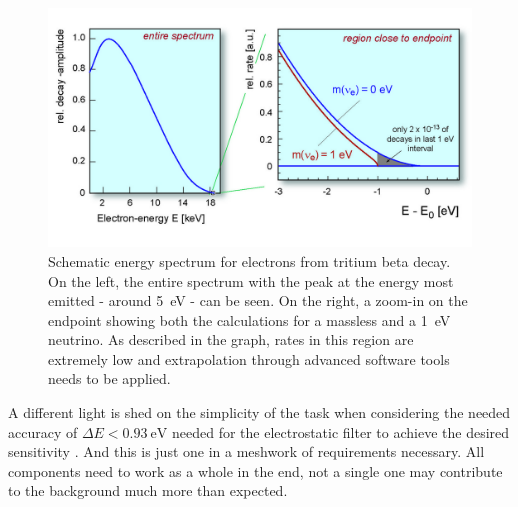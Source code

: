       \begin{figure}
	\centering
      	\includegraphics[width = 0.9 \textwidth]{graphics/katrinExperiment/electronSpectrum.jpg}
      	\caption[Schematic tritium energy spectrum]{Schematic energy spectrum for electrons from tritium beta decay. On the left, the entire spectrum with the peak at the energy most emitted - around \SI{5}{\electronvolt} - can be seen. On the right, a zoom-in on the endpoint showing both the calculations for a massless and a \SI{1}{\electronvolt} neutrino. As described in the graph, rates in this region are extremely low and extrapolation through advanced software tools needs to be applied.}
      	\label{fig:katrinExperiment:tritiumSpectrum}
      \end{figure}
      A different light is shed on the simplicity of the task when considering the needed accuracy of $\Delta E < \SI{0.93}{\electronvolt}$ needed for the electrostatic filter to achieve the desired sensitivity \cite{KATRINWolf}. And this is just one in a meshwork of requirements necessary. All components need to work as a whole in the end, not a single one may contribute to the background much more than expected.
